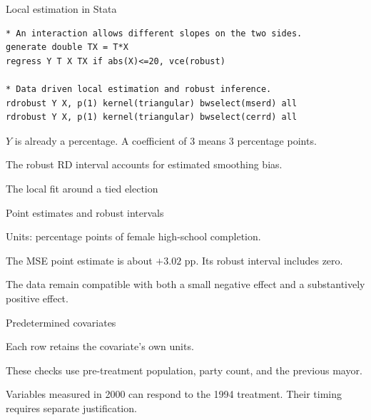 \begin{frame}[fragile]{Local estimation in Stata}
\begin{lstlisting}
* An interaction allows different slopes on the two sides.
generate double TX = T*X
regress Y T X TX if abs(X)<=20, vce(robust)

* Data driven local estimation and robust inference.
rdrobust Y X, p(1) kernel(triangular) bwselect(mserd) all
rdrobust Y X, p(1) kernel(triangular) bwselect(cerrd) all
\end{lstlisting}
\begin{items}
\item $Y$ is already a percentage. A coefficient of 3 means 3 percentage points.
\item The robust RD interval accounts for estimated smoothing bias.
\end{items}
\end{frame}

\begin{frame}{The local fit around a tied election}
\end{frame}

\begin{frame}{Point estimates and robust intervals}

\begin{items}
\item Units: percentage points of female high-school completion.
\item The MSE point estimate is about $+3.02$ pp. Its robust interval includes zero.
\item The data remain compatible with both a small negative effect and a substantively positive effect.
\end{items}
\end{frame}

\begin{frame}{Predetermined covariates}

\begin{items}
\item Each row retains the covariate's own units.
\item These checks use pre-treatment population, party count, and the previous mayor.
\item Variables measured in 2000 can respond to the 1994 treatment. Their timing requires separate justification.
\end{items}
\end{frame}

